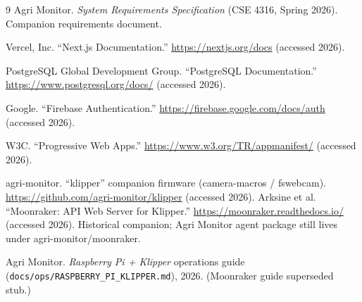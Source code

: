 \documentclass[11pt,letterpaper]{article}
\begin{document}
{}
\begin{thebibliography}{9}
Agri Monitor. \textit{System Requirements Specification} (CSE 4316, Spring 2026). Companion requirements document.

Vercel, Inc. ``Next.js Documentation.'' \url{https://nextjs.org/docs} (accessed 2026).

PostgreSQL Global Development Group. ``PostgreSQL Documentation.'' \url{https://www.postgresql.org/docs/} (accessed 2026).

Google. ``Firebase Authentication.'' \url{https://firebase.google.com/docs/auth} (accessed 2026).

W3C. ``Progressive Web Apps.'' \url{https://www.w3.org/TR/appmanifest/} (accessed 2026).

agri-monitor. ``klipper'' companion firmware (camera-macros / fswebcam). \url{https://github.com/agri-monitor/klipper} (accessed 2026).
Arksine et al. ``Moonraker: API Web Server for Klipper.'' \url{https://moonraker.readthedocs.io/} (accessed 2026). Historical companion; Agri Monitor agent package still lives under agri-monitor/moonraker.

Agri Monitor. \textit{Raspberry Pi + Klipper} operations guide (\texttt{docs/ops/RASPBERRY\_PI\_KLIPPER.md}), 2026. (Moonraker guide superseded stub.)
\end{thebibliography}
\end{document}
